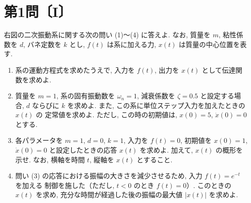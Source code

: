 
\section*{第1問〔I〕}

右図の二次振動系に関する次の問い (1)〜(4) に答えよ. なお, 質量を $m$, 粘性係数を $d$,
バネ定数を $k$ とし, $f(t)$ は系に加える力, $x(t)$ は質量の中心位置を表す.

\begin{center}
\end{center}

\begin{enumerate}[label=(\arabic*)]
  \item 系の運動方程式を求めたうえで, 入力を $f(t)$, 出力を $x(t)$ として伝達関数を求めよ.

  \item 質量を $m=1$, 系の固有振動数を $\omega_n=1$, 減衰係数を $\zeta=0.5$ と設定する場合,
        $d$ ならびに $k$ を求めよ. また, この系に単位ステップ入力を加えたときの $x(t)$ の
        定常値を求めよ. ただし, この時の初期値は, $x(0)=5$, $\dot{x}(0)=0$ とする.

  \item 各パラメータを $m=1$, $d=0$, $k=1$, 入力を $f(t)=0$, 初期値を $x(0)=1$,
        $\dot{x}(0)=0$ と設定したときの応答 $x(t)$ を求めよ. 加えて, $x(t)$ の概形を示せ.
        なお, 横軸を時間 $t$, 縦軸を $x(t)$ とすること.

  \item 問い (3) の応答における振幅の大きさを減少させるため, 入力 $f(t)=e^{-t}$ を加える
        制御を施した（ただし, $t<0$ のとき $f(t)=0$）. このときの $x(t)$ を求め,
        充分な時間が経過した後の振幅の最大値 $|x(t)|$ を求めよ.
\end{enumerate}
